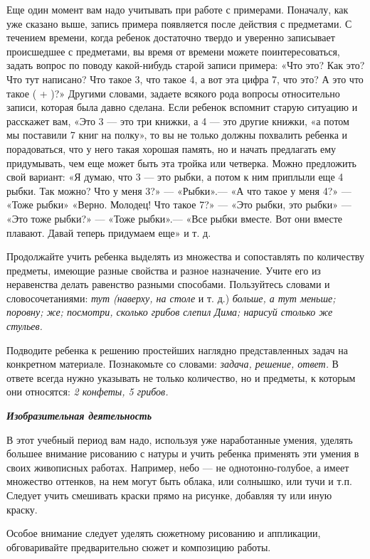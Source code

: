 \documentclass{book}
\renewcommand{\emph}[1]{\textit{#1}}
\begin{document}
Еще один момент вам надо учитывать при работе с примерами. Поначалу, как
уже сказано выше, запись примера появляется после действия с предметами.
С течением времени, когда ребенок достаточно твердо и уверенно
записывает происшедшее с предметами, вы время от времени можете
поинтересоваться, задать вопрос по поводу какой-нибудь старой записи
примера: «Что это? Как это? Что тут написано? Что такое 3, что такое 4,
а вот эта цифра 7, что это? А это что такое ( + )?» Другими словами,
задаете всякого рода вопросы относительно записи, которая была давно
сделана. Если ребенок вспомнит старую ситуацию и расскажет вам, «Это 3
--- это три книжки, а 4 --- это другие книжки, «а потом мы поставили 7
книг на полку», то вы не только должны похвалить ребенка и порадоваться,
что у него такая хорошая память, но и начать предлагать ему придумывать,
чем еще может быть эта тройка или четверка. Можно предложить свой
вариант: «Я думаю, что 3 --- это рыбки, а потом к ним приплыли еще 4
рыбки. Так можно? Что у меня 3?» --- «Рыбки».--- «А что такое у меня 4?»
--- «Тоже рыбки» «Верно. Молодец! Что такое 7?» --- «Это рыбки, это
рыбки» --- «Это тоже рыбки?» --- «Тоже рыбки».--- «Все рыбки вместе. Вот
они вместе плавают. Давай теперь придумаем еще» и т. д.

Продолжайте учить ребенка выделять из множества и сопоставлять по
количеству предметы, имеющие разные свойства и разное назначение. Учите
его из неравенства делать равенство разными способами. Пользуйтесь
словами и словосочетаниями: \emph{тут (наверху, на столе} и т. д.)
\emph{больше, а тут меньше; поровну; же; посмотри, сколько грибов слепил
Дима; нарисуй столько же стульев.}

Подводите ребенка к решению простейших наглядно представленных задач на
конкретном материале. Познакомьте со словами: \emph{задача, решение,
ответ.} В ответе всегда нужно указывать не только количество, но и
предметы, к которым они относятся: \emph{2 конфеты, 5 грибов.}

\emph{\textbf{Изобразительная деятельность}}

В этот учебный период вам надо, используя уже наработанные умения,
уделять большее внимание рисованию с натуры и учить ребенка применять
эти умения в своих живописных работах. Например, небо --- не
однотонно-голубое, а имеет множество оттенков, на нем могут быть облака,
или солнышко, или тучи и т.п. Следует учить смешивать краски прямо на
рисунке, добавляя ту или иную краску.

Особое внимание следует уделять сюжетному рисованию и аппликации,
обговаривайте предварительно сюжет и композицию работы.
\end{document}
